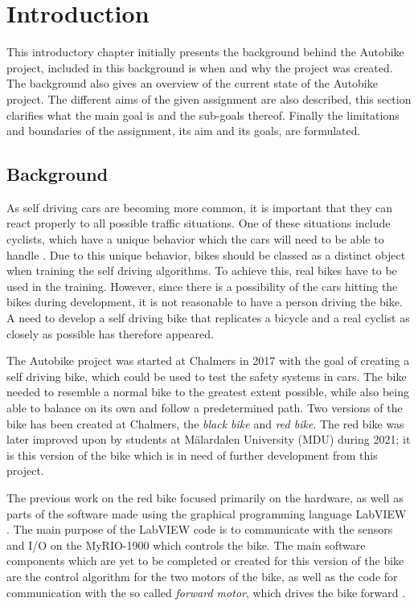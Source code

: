 \chapter{Introduction}

This introductory chapter initially presents the background behind the Autobike project, included in this background is when and why the project was created. The background also gives an overview of the current state of the Autobike project. The different aims of the given assignment are also described, this section clarifies what the main goal is and the sub-goals thereof. Finally the limitations and boundaries of the assignment, its aim and its goals, are formulated.

\section{Background}

As self driving cars are becoming more common, it is important that they can react properly to all possible traffic situations. One of these situations include cyclists, which have a unique behavior which the cars will need to be able to handle \cite{ArgoAI2021AutonomousCyclists}. Due to this unique behavior, bikes should be classed as a distinct object when training the self driving algorithms. To achieve this, real bikes have to be used in the training. However, since there is a possibility of the cars hitting the bikes during development, it is not reasonable to have a person driving the bike. A need to develop a self driving bike that replicates a bicycle and a real cyclist as closely as possible has therefore appeared.

The Autobike project was started at Chalmers in 2017 with the goal of creating a self driving bike, which could be used to test the safety systems in cars. The bike needed to resemble a normal bike to the greatest extent possible, while also being able to balance on its own and follow a predetermined path. Two versions of the bike has been created at Chalmers, the \textit{black bike} and \textit{red bike}. The red bike was later improved upon by students at Mälardalen University (MDU) during 2021; it is this version of the bike which is in need of further development from this project.

The previous work on the red bike focused primarily on the hardware, as well as parts of the software made using the graphical programming language LabVIEW \cite{NationalInstruments2022WhatLabVIEW}. The main purpose of the LabVIEW code is to communicate with the sensors and I/O on the MyRIO-1900 \cite{NationalInstruments2022MyRIO-1900} which controls the bike. The main software components which are yet to be completed or created for this version of the bike are the control algorithm for the two motors of the bike, as well as the code for communication with the so called \textit{forward motor}, which drives the bike forward \cite{AronssonKarlsson2022PROJECTAUTOBIKE}.

